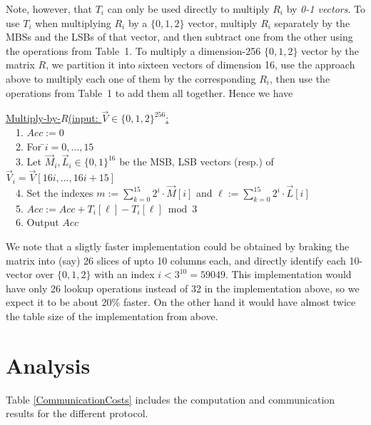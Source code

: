 Note, however, that $T_i$ can only be used directly to multiply $R_i$ by \emph{0-1 vectors}.
To use $T_i$ when multiplying $R_i$ by a $\{0,1,2\}$ vector, multiply $R_i$ separately by the MBSs and the LSBs of that vector, and then subtract one from the other using the operations from Table~1.
To multiply a dimension-256 $\{0,1,2\}$ vector by the matrix $R$, we partition it into sixteen vectors of dimension 16, use the approach above to multiply each one of them by the corresponding $R_i$, then use the operations from Table~1 to add them all together.
Hence we have

\begin{tabbing}
	\underline{Multiply-by-$R$(input: $\vec{V}\in\{0,1,2\}^{256}$:}\\
	~~1. $Acc := 0$\\
	~~2. For \=$i=0,\ldots,15$\\
	~~3. \> Let $\vec{M}_i,\vec{L}_i\in\{0,1\}^{16}$ be the MSB, LSB vectors (resp.) of $\vec{V}_i=\vec{V}[16i,\ldots,16i+15]$\\
	~~4. \> Set the indexes $m:=\sum_{k=0}^{15}2^i\cdot\vec{M}[i]$
	and $\ell:=\sum_{k=0}^{15}2^i\cdot\vec{L}[i]$\\
	~~5. \> $Acc := Acc + T_i[\ell] - T_i[\ell] \bmod 3$\\
	~~6. Output $Acc$
\end{tabbing}

We note that a sligtly faster implementation could be obtained by braking the matrix into (say) 26 slices of upto 10 columns each, and directly identify each 10-vector over $\{0,1,2\}$ with an index $i<3^{10}=59049$.
This implementation would have only 26 lookup operations instead of 32 in the implementation above, so we expect it to be about 20\% faster. On the other hand it would have almost twice the table size of the implementation from above.

\section{Analysis}

Table \ref{CommunicationCosts} includes the computation and communication results for the different protocol.

